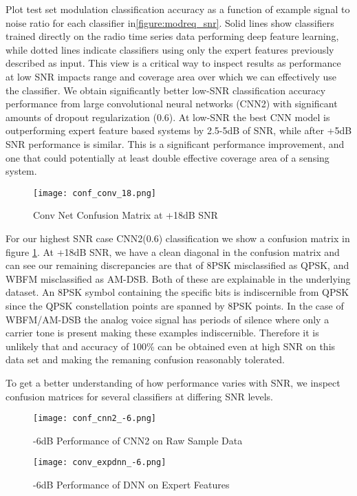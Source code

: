 \documentclass[runningheads,a4paper]{llncs}
\begin{document}
Plot test set modulation classification accuracy as a function of example signal to noise ratio for each classifier in\ref{figure:modreq_snr}.  Solid lines show classifiers trained directly on the radio time series data performing deep feature learning, while dotted lines indicate classifiers using only the expert features previously described as input.
This view is a critical way to inspect results as performance at low SNR impacts range and coverage area over which we can effectively use the classifier.
We obtain significantly better low-SNR classification accuracy performance from large convolutional neural networks (CNN2) with significant amounts of dropout regularization (0.6).  At low-SNR the best CNN model is outperforming expert feature based systems by 2.5-5dB of SNR, while after +5dB SNR performance is similar.  This is a significant performance improvement, and one that could potentially at least double effective coverage area of a sensing system.

\begin{figure}[ht!]
  \centering
      \texttt{[image: conf\_conv\_18.png]}
  \caption{Conv Net Confusion Matrix at +18dB SNR}\label{figure:bestconf}
\end{figure}

For our highest SNR case CNN2(0.6) classification we show a confusion matrix in figure \ref{figure:bestconf}.   At +18dB SNR, we have a clean diagonal in the confusion matrix and can see our remaining discrepancies are that of 8PSK misclassified as QPSK, and WBFM misclassified as AM-DSB.   Both of these are explainable in the underlying dataset.  An 8PSK symbol containing the specific bits is indiscernible from QPSK since the QPSK constellation points are spanned by 8PSK points.  In the case of WBFM/AM-DSB the analog voice signal has periods of silence where only a carrier tone is present making these examples indiscernible.  Therefore it is unlikely that and accuracy of 100\% can be obtained even at high SNR on this data set and making the remaning confusion reasonably tolerated.

To get a better understanding of how performance varies with SNR, we inspect confusion matrices for several classifiers at differing SNR levels.

\begin{figure}[ht]
\centering
\begin{minipage}[b]{0.45\linewidth}
      \texttt{[image: conf\_cnn2\_-6.png]}
  \caption{-6dB Performance of CNN2 on Raw Sample Data}\label{figure:vlow1}
\end{minipage}
\quad
\begin{minipage}[b]{0.45\linewidth}
      \texttt{[image: conv\_expdnn\_-6.png]}
  \caption{-6dB Performance of DNN on Expert Features}\label{figure:vlow2}
\end{minipage}
\end{figure}
\end{document}
